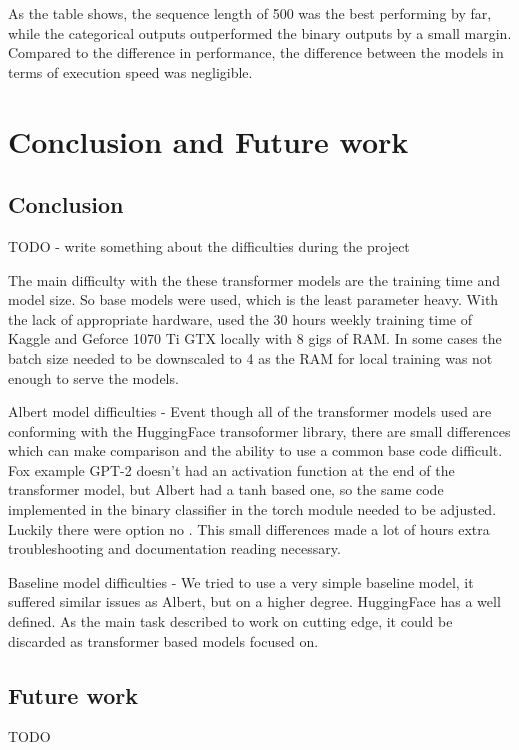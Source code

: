 \documentclass[runningheads]{llncs}
\begin{document}
As the table shows, the sequence length of 500 was the best performing by far, while the categorical outputs outperformed the binary outputs by a small margin. Compared to the difference in performance, the difference between the models in terms of execution speed was negligible.

\section{Conclusion and Future work}

\subsection{Conclusion}

TODO - write something about the difficulties during the project


The main difficulty with the these transformer models are the training time and model size. So base models were used, which is the least parameter heavy. With the lack of appropriate hardware, used the 30 hours weekly training time of Kaggle and Geforce 1070 Ti GTX locally with 8 gigs of RAM. In some cases the batch size needed to be downscaled to 4 as the RAM for local training was not enough to serve the models.

Albert model difficulties - Event though all of the transformer models used are conforming with the HuggingFace transoformer library, there are small differences which can make comparison and the ability to use a common base code difficult. Fox example GPT-2 doesn't had an activation function at the end of the transformer model, but Albert had a tanh based one, so the same code implemented in the binary classifier in the torch module needed to be adjusted. Luckily there were option no . This small differences made a lot of hours extra troubleshooting and documentation reading necessary.

Baseline model difficulties - We tried to use a very simple baseline model, it suffered similar issues as Albert, but on a higher degree. HuggingFace has a well defined. As the main task described to work on cutting edge, it could be discarded as transformer based models focused on.

\subsection{Future work}

TODO



\end{document}
